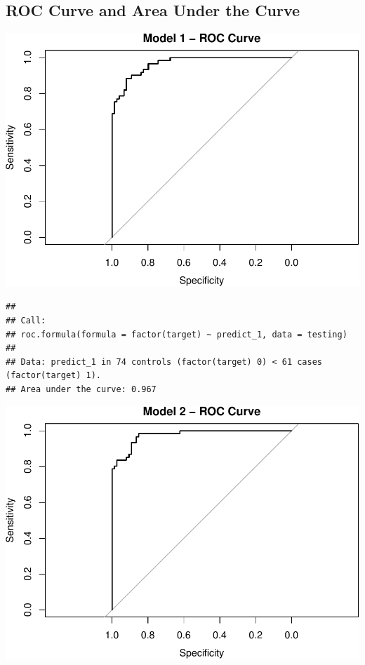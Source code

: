 \documentclass[]{article}
\begin{document}
\subsection{ROC Curve and Area Under the
Curve}\label{roc-curve-and-area-under-the-curve}

\includegraphics{HW3_Final_files/figure-latex/unnamed-chunk-19-1.pdf}

\begin{verbatim}
## 
## Call:
## roc.formula(formula = factor(target) ~ predict_1, data = testing)
## 
## Data: predict_1 in 74 controls (factor(target) 0) < 61 cases (factor(target) 1).
## Area under the curve: 0.967
\end{verbatim}

\includegraphics{HW3_Final_files/figure-latex/unnamed-chunk-19-2.pdf}
\end{document}

